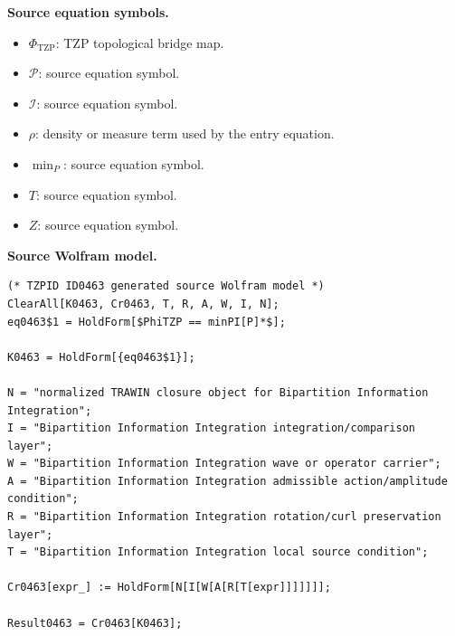 \begin{minipage}[t]{0.49\linewidth}
\begingroup
\small
\raggedright
\textbf{Source equation symbols.}\par
\begin{itemize}[leftmargin=1.35em,itemsep=1pt,topsep=1pt,parsep=0pt]
    \item $\Phi_{\mathrm{TZP}}$: TZP topological bridge map.
    \item $\mathcal{P}$: source equation symbol.
    \item $\mathcal{I}$: source equation symbol.
    \item $\rho$: density or measure term used by the entry equation.
    \item $\min_{P}$: source equation symbol.
    \item $T$: source equation symbol.
    \item $Z$: source equation symbol.
\end{itemize}
\endgroup
\end{minipage}\hfill
\begin{minipage}[t]{0.47\linewidth}
\begingroup
\scriptsize
\raggedright
\textbf{Source Wolfram model.}\par
\begin{Verbatim}[fontsize=\tiny,breaklines=true,breakanywhere=true]
(* TZPID ID0463 generated source Wolfram model *)
ClearAll[K0463, Cr0463, T, R, A, W, I, N];
eq0463$1 = HoldForm[$PhiTZP == minPI[P]*$];

K0463 = HoldForm[{eq0463$1}];

N = "normalized TRAWIN closure object for Bipartition Information Integration";
I = "Bipartition Information Integration integration/comparison layer";
W = "Bipartition Information Integration wave or operator carrier";
A = "Bipartition Information Integration admissible action/amplitude condition";
R = "Bipartition Information Integration rotation/curl preservation layer";
T = "Bipartition Information Integration local source condition";

Cr0463[expr_] := HoldForm[N[I[W[A[R[T[expr]]]]]]];

Result0463 = Cr0463[K0463];
\end{Verbatim}
\endgroup
\end{minipage}

